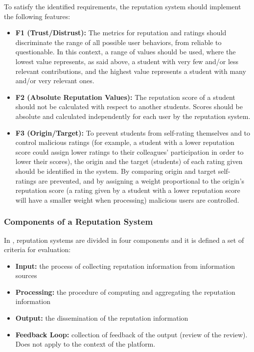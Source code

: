 To satisfy the identified requirements, the reputation system should implement the following features:
\begin{itemize}
\item \textbf{F1 (Trust/Distrust):} The metrics for reputation and ratings should discriminate the range of all possible user behaviors, from reliable to questionable. In this context, a range of values should be used, where the lowest value represents, as said above, a student with very few and/or less relevant contributions, and the highest value represents a student with many and/or very relevant ones. 

\item \textbf{F2 (Absolute Reputation Values):} The reputation score of a student should not be calculated with respect to another students. Scores should be absolute and calculated independently for each user by the reputation system.

\item \textbf{F3 (Origin/Target):} To prevent students from self-rating themselves and to control malicious ratings (for example, a student with a lower reputation score could assign lower ratings to their colleagues' participation in order to lower their scores), the origin and the target (students) of each rating given should be identified in the system. By comparing origin and target self-ratings are prevented, and by assigning a weight proportional to the origin's reputation score (a rating given by a student with a lower reputation score will have a smaller weight when processing) malicious users are controlled.
\end{itemize}

\subsubsection{Components of a Reputation System}
In \cite{liu2012systematic,liu2010evaluation}, reputation systems are divided in four components and it is defined a set of criteria for evaluation:

\begin{itemize}
\item \textbf{Input:} the process of collecting reputation information from information sources
\item \textbf{Processing:} the procedure of computing and aggregating the reputation information
\item \textbf{Output:} the dissemination of the reputation information
\item \textbf{Feedback Loop:} collection of feedback of the output (review of the review). Does not apply to the context of the platform.
\end{itemize}

